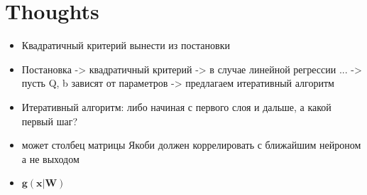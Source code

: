 \documentclass[a4paper,12pt]{article}
\theoremstyle{plain} %
\theoremstyle{definition} %
\theoremstyle{remark} %
\newcommand{\bx}{\mathbf{x}}
\begin{document}
	\section{Thoughts}
	\begin{itemize}
		\item Квадратичный критерий вынести из постановки
		\item Постановка -> квадратичный критерий -> в случае линейной регрессии ... -> пусть Q, b зависят от параметров -> предлагаем итеративный алгоритм 
		\item Итеративный алгоритм: либо начиная с первого слоя и дальше, а какой первый шаг?
		\item может столбец матрицы Якоби должен коррелировать с ближайшим нейроном а не выходом
		\item $\mathbf{g}(\bx | \mathbf{W})$
		
	\end{itemize}
	
	
\end{document}
